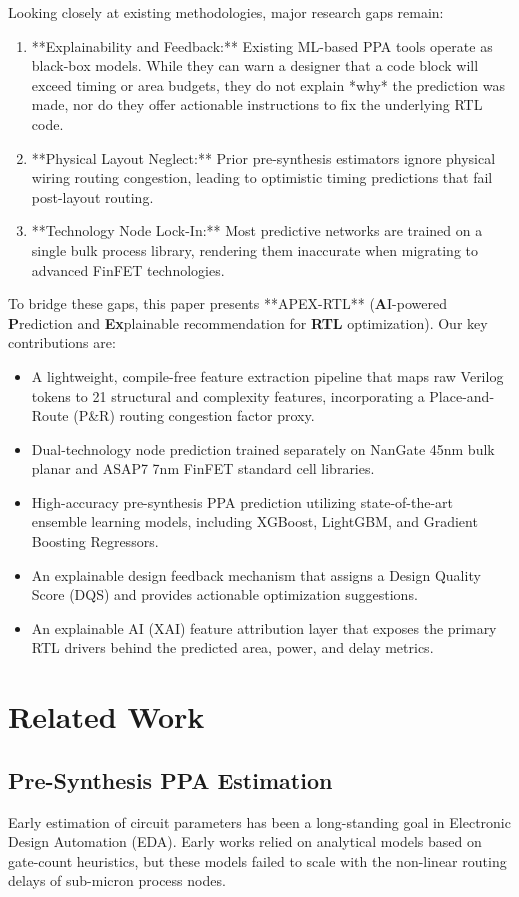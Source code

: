 \documentclass[conference]{IEEEtran}
\begin{document}
Looking closely at existing methodologies, major research gaps remain:
\begin{enumerate}
    \item **Explainability and Feedback:** Existing ML-based PPA tools operate as black-box models. While they can warn a designer that a code block will exceed timing or area budgets, they do not explain *why* the prediction was made, nor do they offer actionable instructions to fix the underlying RTL code.
    \item **Physical Layout Neglect:** Prior pre-synthesis estimators ignore physical wiring routing congestion, leading to optimistic timing predictions that fail post-layout routing.
    \item **Technology Node Lock-In:** Most predictive networks are trained on a single bulk process library, rendering them inaccurate when migrating to advanced FinFET technologies.
\end{enumerate}

To bridge these gaps, this paper presents **APEX-RTL** (\textbf{A}I-powered \textbf{P}rediction and \textbf{Ex}plainable recommendation for \textbf{RTL} optimization). Our key contributions are:
\begin{itemize}
    \item A lightweight, compile-free feature extraction pipeline that maps raw Verilog tokens to 21 structural and complexity features, incorporating a Place-and-Route (P\&R) routing congestion factor proxy.
    \item Dual-technology node prediction trained separately on NanGate 45nm bulk planar and ASAP7 7nm FinFET standard cell libraries.
    \item High-accuracy pre-synthesis PPA prediction utilizing state-of-the-art ensemble learning models, including XGBoost, LightGBM, and Gradient Boosting Regressors.
    \item An explainable design feedback mechanism that assigns a Design Quality Score (DQS) and provides actionable optimization suggestions.
    \item An explainable AI (XAI) feature attribution layer that exposes the primary RTL drivers behind the predicted area, power, and delay metrics.
\end{itemize}

\section{Related Work}
\subsection{Pre-Synthesis PPA Estimation}
Early estimation of circuit parameters has been a long-standing goal in Electronic Design Automation (EDA). Early works relied on analytical models based on gate-count heuristics, but these models failed to scale with the non-linear routing delays of sub-micron process nodes. 
\end{document}
